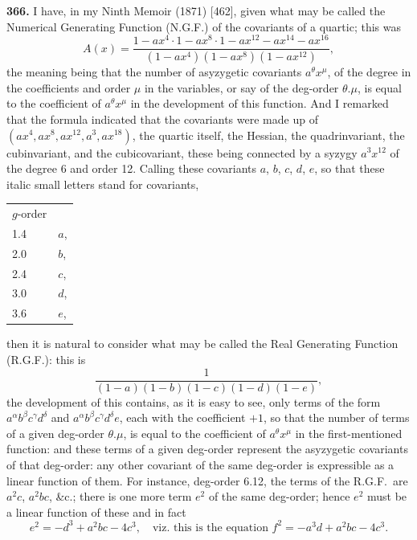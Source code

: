 \documentclass[11pt,a4paper]{book}
\begin{document}
\medskip

\noindent\textbf{366.} I have, in my Ninth Memoir (1871) [462], given what may be called the Numerical Generating Function (N.G.F.) of the covariants of a quartic; this was
\[
A(x) = \frac{1 - ax^4 \cdot 1 - ax^8 \cdot 1 - ax^{12} - ax^{14} - ax^{16}}{(1 - ax^4)(1 - ax^8)(1 - ax^{12})},
\]
the meaning being that the number of asyzygetic covariants $a^\theta x^\mu$, of the degree in the coefficients and order $\mu$ in the variables, or say of the deg-order $\theta.\mu$, is equal to the coefficient of $a^\theta x^\mu$ in the development of this function. And I remarked that the formula indicated that the covariants were made up of $(ax^4, ax^8, ax^{12}, a^3, ax^{18})$, the quartic itself, the Hessian, the quadrinvariant, the cubinvariant, and the cubicovariant, these being connected by a syzygy $a^3 x^{12}$ of the degree 6 and order 12. Calling these covariants $a$, $b$, $c$, $d$, $e$, so that these italic small letters stand for covariants,
\begin{center}
\begin{tabular}{l@{\quad}l}
$g$-order & \\[2pt]
1.4 & $a$, \\
2.0 & $b$, \\
2.4 & $c$, \\
3.0 & $d$, \\
3.6 & $e$,
\end{tabular}
\end{center}
then it is natural to consider what may be called the Real Generating Function (R.G.F.): this is
\[
\frac{1}{(1-a)(1-b)(1-c)(1-d)(1-e)},
\]
the development of this contains, as it is easy to see, only terms of the form $a^\alpha b^\beta c^\gamma d^\delta$ and $a^\alpha b^\beta c^\gamma d^\delta e$, each with the coefficient $+1$, so that the number of terms of a given deg-order $\theta.\mu$, is equal to the coefficient of $a^\theta x^\mu$ in the first-mentioned function: and these terms of a given deg-order represent the asyzygetic covariants of that deg-order: any other covariant of the same deg-order is expressible as a linear function of them. For instance, deg-order 6.12, the terms of the R.G.F.\ are $a^2 c$, $a^2 bc$, \&c.; there is one more term $e^2$ of the same deg-order; hence $e^2$ must be a linear function of these and in fact
\[
e^2 = -d^3 + a^2 bc - 4c^3,\quad\text{viz.\ this is the equation }f^2 = -a^3 d + a^2 bc - 4c^3.
\]
\end{document}
